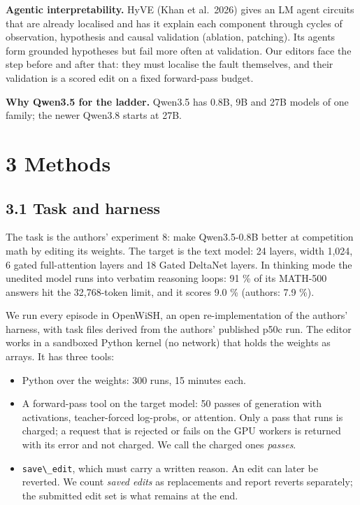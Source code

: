 \documentclass[
  10pt,
]{article}
\newcommand{\passthrough}[1]{#1}
\providecommand{\tightlist}{%
  \setlength{\itemsep}{0pt}\setlength{\parskip}{0pt}}
\begin{document}
\textbf{Agentic interpretability.} HyVE (Khan et al.~2026) gives an LM
agent circuits that are already localised and has it explain each
component through cycles of observation, hypothesis and causal
validation (ablation, patching). Its agents form grounded hypotheses but
fail more often at validation. Our editors face the step before and
after that: they must localise the fault themselves, and their
validation is a scored edit on a fixed forward-pass budget.

\textbf{Why Qwen3.5 for the ladder.} Qwen3.5 has 0.8B, 9B and 27B models
of one family; the newer Qwen3.8 starts at 27B.

\section{3 Methods}\label{methods}

\subsection{3.1 Task and harness}\label{task-and-harness}

The task is the authors' experiment 8: make Qwen3.5-0.8B better at
competition math by editing its weights. The target is the text model:
24 layers, width 1,024, 6 gated full-attention layers and 18 Gated
DeltaNet layers. In thinking mode the unedited model runs into verbatim
reasoning loops: 91 \% of its MATH-500 answers hit the 32,768-token
limit, and it scores 9.0 \% (authors: 7.9 \%).

We run every episode in OpenWiSH, an open re-implementation of the
authors' harness, with task files derived from the authors' published
p50c run. The editor works in a sandboxed Python kernel (no network)
that holds the weights as arrays. It has three tools:

\begin{itemize}
\tightlist
\item
  Python over the weights: 300 runs, 15 minutes each.
\item
  A forward-pass tool on the target model: 50 passes of generation with
  activations, teacher-forced log-probs, or attention. Only a pass that
  runs is charged; a request that is rejected or fails on the GPU
  workers is returned with its error and not charged. We call the
  charged ones \emph{passes}.
\item
  \passthrough{\lstinline!save\_edit!}, which must carry a written
  reason. An edit can later be reverted. We count \emph{saved edits} as
  replacements and report reverts separately; the submitted edit set is
  what remains at the end.
\end{itemize}
\end{document}
